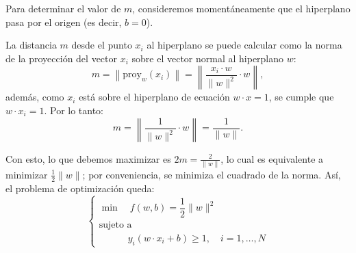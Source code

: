\documentclass[a4,11pt]{aleph-notas}
\begin{document}
Para determinar el valor de $m$, consideremos momentáneamente que el hiperplano pasa por el origen (es decir, $b=0$).
\begin{center}
\end{center}

La distancia $m$ desde el punto $x_i$ al hiperplano se puede calcular como la norma de la proyección del vector ${x}_i$ sobre el vector normal al hiperplano ${w}$:
\[
    m 
    = \left\| \text{proy}_{{w}}({x_i}) \right\|
    = \left\| \frac{{x_i} \cdot {w}}{\|{w}\|^2} \cdot {w} \right\|,
\]
además, como $x_i$ está sobre el hiperplano de ecuación ${w} \cdot {x} = 1$, se cumple que ${w} \cdot {x}_i = 1$. Por lo tanto:
\[
    m 
    = \left\| \frac{1}{\|{w}\|^2} \cdot {w} \right\| 
    = \frac{1}{\|{w}\|}.
\]

Con esto, lo que debemos maximizar es $2m = \frac{2}{\|{w}\|}$, lo cual es equivalente a minimizar $\frac{1}{2} \|{w}\|$; por conveniencia, se minimiza el cuadrado de la norma. Así, el problema de optimización queda:
\[
    \begin{cases}
        \min \quad f(w,b) = \dfrac{1}{2} \|{w}\|^2 \\
        \text{sujeto a}\\ \qquad\quad y_i ({w} \cdot {x}_i + b) \geq 1, \quad i = 1,\ldots, N
    \end{cases}
\]
\end{document}
